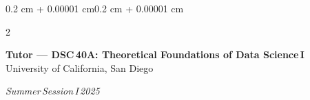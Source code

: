 \documentclass[10pt, letterpaper]{article}
\newenvironment{highlights}{
    \begin{itemize}[
        topsep=0.10 cm,
        parsep=0.10 cm,
        partopsep=0pt,
        itemsep=0pt,
        leftmargin=0.4 cm + 10pt
    ]
}{\end{itemize}}
\newenvironment{onecolentry}{
    \begin{adjustwidth}{0.2 cm + 0.00001 cm}{0.2 cm + 0.00001 cm}
}{\end{adjustwidth}}
\newenvironment{twocolentry}[2][]{
    \onecolentry
    \def\secondColumn{#2}
    \setcolumnwidth{\fill, 4.5 cm}
    \begin{paracol}{2}
}{
    \switchcolumn \raggedleft \secondColumn
    \end{paracol}
    \endonecolentry
}
\begin{document}






    \vspace{0.15 cm}

    \begin{twocolentry}{\textit{Summer\,Session\,I\,2025}}
        \textbf{Tutor — DSC\,40A: Theoretical Foundations of Data Science\,I}\\
        University of California, San Diego
    \end{twocolentry}
\end{document}
